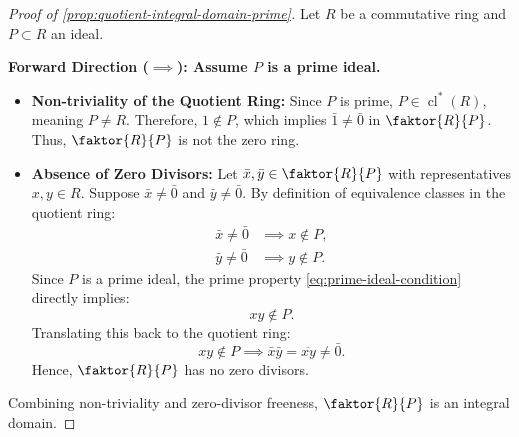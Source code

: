 \begin{content}
\begin{proof}[Proof of \cref{prop:quotient-integral-domain-prime}]
Let $R$ be a commutative ring and $P \subset R$ an ideal.

\textbf{Forward Direction ($\implies$): Assume $P$ is a prime ideal.}
\begin{itemize}
    \item \textbf{Non-triviality of the Quotient Ring:} Since $P$ is prime, $P \in \operatorname{cl}^*(R)$, meaning $P \neq R$. Therefore, $1 \notin P$, which implies $\bar{1} \neq \bar{0}$ in $\faktor{R}{P}$. Thus, $\faktor{R}{P}$ is not the zero ring.
    \item \textbf{Absence of Zero Divisors:} Let $\bar{x}, \bar{y} \in \faktor{R}{P}$ with representatives $x, y \in R$. Suppose $\bar{x} \neq \bar{0}$ and $\bar{y} \neq \bar{0}$.
    By definition of equivalence classes in the quotient ring:
    \begin{align*}
    \bar{x} \neq \bar{0} &\implies x \notin P, \\
    \bar{y} \neq \bar{0} &\implies y \notin P.
    \end{align*}
    Since $P$ is a prime ideal, the prime property \eqref{eq:prime-ideal-condition} directly implies:
    \[
    x y \notin P.
    \]
    Translating this back to the quotient ring:
    \[
    x y \notin P \implies \bar{x} \bar{y} = \overline{x y} \neq \bar{0}.
    \]
    Hence, $\faktor{R}{P}$ has no zero divisors.
\end{itemize}
Combining non-triviality and zero-divisor freeness, $\faktor{R}{P}$ is an integral domain.
\end{proof}

\end{content}

